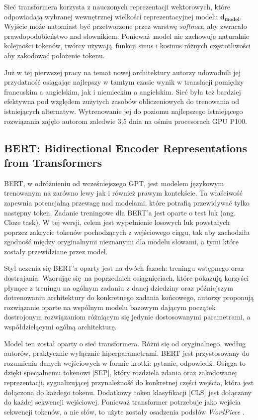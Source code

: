 Sieć transformera korzysta z nauczonych reprezentacji wektorowych, które odpowiadają wybranej wewnętrznej wielkości reprezentacyjnej modelu $\mathbf{d_{model}}$. Wyjście może natomiast być przetworzone przez warstwę \emph{softmax}, aby zwracało prawdopodobieństwo nad słownikiem. Ponieważ model nie zachowuje naturalnie kolejności tokenów, twórcy używają funkcji sinus i kosinus różnych częstotliwości aby zakodować położenie tokenu.\newline

Już w tej pierwszej pracy na temat nowej architektury autorzy udowodnili jej przydatność osiągając najlepszy w tamtym czasie wynik w translacji pomiędzy francuskim a angielskim, jak i niemieckim a angielskim. Sieć była też bardziej efektywna pod względem zużytych zasobów obliczeniowych do trenowania od istniejących alternatyw. Wytrenowanie jej do poziomu najlepszego istniejącego rozwiązania zajęło autorom zaledwie 3,5 dnia na ośmiu procesorach GPU P100. \autocite{vaswani2017attention}

\subsection{BERT: Bidirectional Encoder Representations  from Transformers}

BERT, w odróżnieniu od wcześniejszego GPT, jest modelem językowym trenowanym na zarówno lewy jak i również prawym kontekście. Ta właściwość zapewnia potencjalną przewagę nad modelami, które potrafią przewidywać tylko następny token. Zadanie treningowe dla BERT'a jest oparte o test luk (ang. Cloze task). W tej wersji, celem jest wypełnienie losowych luk powstałych poprzez zakrycie tokenów pochodzących z wejściowego ciągu, tak aby zachodziła zgodność między oryginalnymi nieznanymi dla modelu słowami, a tymi które zostały przewidziane przez model.\newline

Styl uczenia się BERT'a oparty jest na dwóch fazach: treningu wstępnego oraz dostrajania. Wzorując się na poprzednich osiągnięciach, które pokazują korzyści płynące z treningu na ogólnym zadaniu z danej dziedziny oraz późniejszym dotrenowaniu architektury do konkretnego zadania końcowego, autorzy proponują rozwiązanie oparte na wspólnym modelu bazowym dającym początek dostrojonym rozwiązaniom różniącym się jedynie dostosowanymi parametrami, a współdzielącymi ogólną architekturę.\newline

Model ten został oparty o sieć transformera. Różni się od oryginalnego, według autorów, praktycznie wyłącznie hiperparametrami. BERT jest przystosowany do rozumienia danych wejściowych w formie krotki: pytanie, odpowiedź. Osiąga to dzięki specjalnemu tokenowi [SEP], który rozdziela zdania oraz zakodowanej reprezentacji, sygnalizującej przynależność do konkretnej części wejścia, która jest dołączona do każdego tokenu. Dodatkowy token klasyfikacji [CLS] jest dołączany do każdej sekwencji wejściowej. Ponieważ transformer potrzebuje jako wejścia sekwencji tokenów, a nie słów, to użyte zostały osadzenia podsłów \emph{WordPiece} \autocite{devlin2018bert}.\newline

